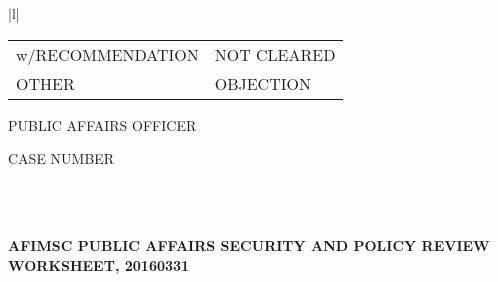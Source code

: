 \documentclass{article}
\begin{document}
{\begin{tabular}{|l|}
{\begin{tabular}{ll}
\radioButton{10a}{10bp}{10bp}{yes}\hspace{2pt} \scriptsize w/RECOMMENDATION &
\radioButton{10a}{10bp}{10bp}{no} \hspace{2pt} \scriptsize NOT CLEARED\\[4pt]

\radioButton{10a}{10bp}{10bp}{yes}\hspace{2pt} \scriptsize OTHER &
\radioButton{10a}{10bp}{10bp}{no} \hspace{2pt} \scriptsize OBJECTION

\end{tabular}
} \vrule \hspace{1pt}

\parbox[][\rhXIII][c]{0.4\textwidth}{
\vspace{1pt}
\small PUBLIC AFFAIRS OFFICER\\[4pt]
}\vrule \hspace{1pt}

\parbox[][\rhXIII][t]{0.2\textwidth}{
\vspace{2pt}
\small CASE NUMBER\\[4pt]
}\\
\hline

\end{tabular}
}\\[2pt]
\textbf{AFIMSC PUBLIC AFFAIRS SECURITY AND POLICY REVIEW WORKSHEET, 20160331}

\newpage
\end{document}
